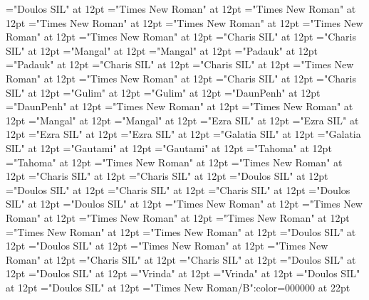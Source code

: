 \documentclass[c5paper,twoside]{article}
\begin{document}
\font\divsehfonipaxetic="Doulos SIL" at 12pt
\font\spanru="Times New Roman" at 12pt
\font\divru="Times New Roman" at 12pt
\font\spanqaaxlel="Times New Roman" at 12pt
\font\divqaaxlel="Times New Roman" at 12pt
\font\spanpt="Times New Roman" at 12pt
\font\divpt="Times New Roman" at 12pt
\font\spannko="Charis SIL" at 12pt
\font\divnko="Charis SIL" at 12pt
\font\spanne="Mangal" at 12pt
\font\divne="Mangal" at 12pt
\font\spanmy="Padauk" at 12pt
\font\divmy="Padauk" at 12pt
\font\spanms="Charis SIL" at 12pt
\font\divms="Charis SIL" at 12pt
\font\spanlv="Times New Roman" at 12pt
\font\divlv="Times New Roman" at 12pt
\font\spankup="Charis SIL" at 12pt
\font\divkup="Charis SIL" at 12pt
\font\spanko="Gulim" at 12pt
\font\divko="Gulim" at 12pt
\font\spankm="DaunPenh" at 12pt
\font\divkm="DaunPenh" at 12pt
\font\spanid="Times New Roman" at 12pt
\font\divid="Times New Roman" at 12pt
\font\spanhi="Mangal" at 12pt
\font\divhi="Mangal" at 12pt
\font\spanhe="Ezra SIL" at 12pt
\font\divhe="Ezra SIL" at 12pt
\font\spanhbo="Ezra SIL" at 12pt
\font\divhbo="Ezra SIL" at 12pt
\font\spangrc="Galatia SIL" at 12pt
\font\divgrc="Galatia SIL" at 12pt
\font\spanggoTeluIN="Gautami" at 12pt
\font\divggoTeluIN="Gautami" at 12pt
\font\spanggofonipaxemic="Tahoma" at 12pt
\font\divggofonipaxemic="Tahoma" at 12pt
\font\spanfr="Times New Roman" at 12pt
\font\divfr="Times New Roman" at 12pt
\font\spanfrZxxxxaudio="Charis SIL" at 12pt
\font\divfrZxxxxaudio="Charis SIL" at 12pt
\font\spanflr="Doulos SIL" at 12pt
\font\divflr="Doulos SIL" at 12pt
\font\spanflrZxxxxaudio="Charis SIL" at 12pt
\font\divflrZxxxxaudio="Charis SIL" at 12pt
\font\spanflrQaaaxtone="Doulos SIL" at 12pt
\font\divflrQaaaxtone="Doulos SIL" at 12pt
\font\spanfa="Times New Roman" at 12pt
\font\divfa="Times New Roman" at 12pt
\font\spanes="Times New Roman" at 12pt
\font\dives="Times New Roman" at 12pt
\font\spanen="Times New Roman" at 12pt
\font\diven="Times New Roman" at 12pt
\font\spanenfonipa="Doulos SIL" at 12pt
\font\divenfonipa="Doulos SIL" at 12pt
\font\spande="Times New Roman" at 12pt
\font\divde="Times New Roman" at 12pt
\font\spanbzh="Charis SIL" at 12pt
\font\divbzh="Charis SIL" at 12pt
\font\spanbzhfonipa="Doulos SIL" at 12pt
\font\divbzhfonipa="Doulos SIL" at 12pt
\font\spanbn="Vrinda" at 12pt
\font\divbn="Vrinda" at 12pt
\font\spanbdu="Doulos SIL" at 12pt
\font\divbdu="Doulos SIL" at 12pt
\color{black} 
\thispagestyle{empty} 
\font\CoverPageHeading="Times New Roman/B":color=000000 at 22pt 
\end{document}
